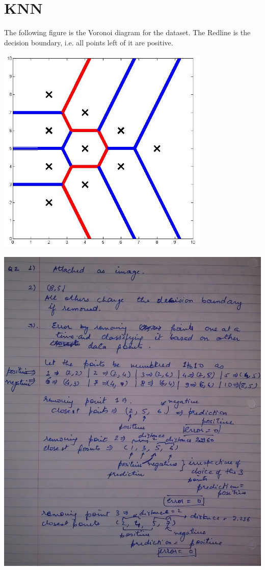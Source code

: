 \documentclass[letterpaper]{article}
\begin{document}
\section{KNN}
The following figure is the Voronoi diagram for the dataset. The Redline is the decision boundary, i.e. all points left of it are positive.
\begin{center}
\includegraphics[width = 4in]{8.png}
\end{center}
\begin{center}
\includegraphics[width = 6in]{9.png}
\end{center}
\end{document}
